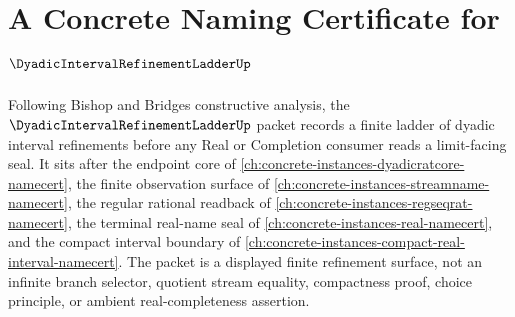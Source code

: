 \chapter{A Concrete Naming Certificate for $\DyadicIntervalRefinementLadderUp$}
\label{ch:concrete-instances-dyadic-interval-refinement-ladder-namecert}

Following Bishop and Bridges constructive analysis, the $\DyadicIntervalRefinementLadderUp$ packet records a finite ladder of dyadic interval refinements before any Real or Completion consumer reads a limit-facing seal. It sits after the endpoint core of \autoref{ch:concrete-instances-dyadicratcore-namecert}, the finite observation surface of \autoref{ch:concrete-instances-streamname-namecert}, the regular rational readback of \autoref{ch:concrete-instances-regseqrat-namecert}, the terminal real-name seal of \autoref{ch:concrete-instances-real-namecert}, and the compact interval boundary of \autoref{ch:concrete-instances-compact-real-interval-namecert}. The packet is a displayed finite refinement surface, not an infinite branch selector, quotient stream equality, compactness proof, choice principle, or ambient real-completeness assertion.

